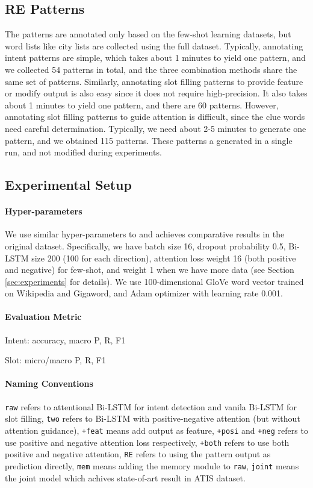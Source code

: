 \subsection{RE Patterns}
\label{re_in_exp}
The \RE patterns are annotated only based on the few-shot learning datasets, but word lists like city lists are collected using the full dataset. Typically, annotating intent patterns are simple, which takes about 1 minutes to yield one pattern, and we collected 54 patterns in total, and the three combination methods share the same set of patterns. Similarly, annotating slot filling patterns to provide feature or modify output is also easy since it does not require high-precision. It also takes about 1 minutes to yield one pattern, and there are 60 patterns. However, annotating slot filling patterns to guide attention is difficult, since the clue words need careful determination. Typically, we need about 2-5 minutes to generate one pattern, and we obtained 115 patterns. These patterns a generated in a single run, and not modified during experiments.


\subsection{Experimental Setup}
\paragraph{Hyper-parameters}
We use similar hyper-parameters to \cite{liu2016attention} and achieves comparative results in the original dataset. Specifically, we have batch size 16, dropout probability 0.5, Bi-LSTM size 200 (100 for each direction), attention loss weight 16 (both positive and negative) for few-shot, and weight 1 when we have more data (see Section \ref{sec:experiments} for details). We use 100-dimensional GloVe \cite{pennington2014glove} word vector trained on Wikipedia and Gigaword, and Adam optimizer \cite{kingma2014adam} with learning rate 0.001.

\paragraph{Evaluation Metric}
Intent: accuracy, macro P, R, F1

Slot: micro/macro P, R, F1

\paragraph{Naming Conventions}
\texttt{raw} refers to attentional Bi-LSTM for intent detection and vanila Bi-LSTM for slot filling, \texttt{two} refers to Bi-LSTM with positive-negative attention (but without attention guidance), \texttt{+feat} means add \RE output as feature, \texttt{+posi} and \texttt{+neg} refers to use positive and negative attention loss respectively, \texttt{+both} refers to use both positive and negative attention, \texttt{RE} refers to using the \RE pattern output as prediction directly, \texttt{mem} means adding the memory module \cite{kaiser2017learning} to \texttt{raw}, \texttt{joint} means the joint model \cite{liu2016attention} which achives state-of-art result in ATIS dataset. 




